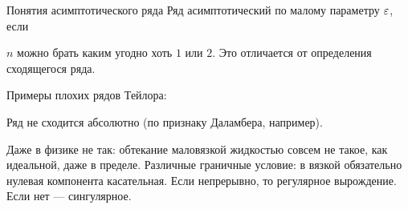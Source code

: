 Понятия асимптотического ряда
Ряд асимптотический по малому параметру ${\varepsilon}$, если 

$n$ можно брать каким угодно хоть $1$ или $2$.
Это отличается от определения сходящегося ряда.

Примеры плохих рядов Тейлора:

Ряд не сходится абсолютно (по признаку Даламбера, например).

\al{
}

Даже в физике не так: обтекание маловязкой жидкостью совсем не такое, как идеальной, даже в пределе. Различные граничные условие: в вязкой обязательно нулевая компонента касательная.
Если непрерывно, то регулярное вырождение. Если нет --- сингулярное.


